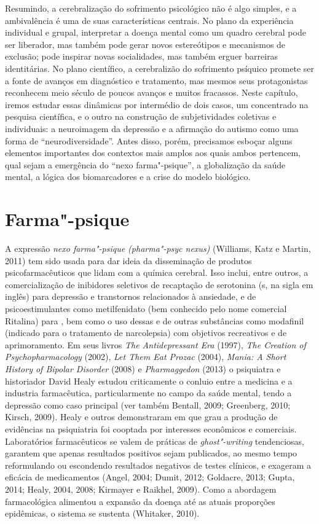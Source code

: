 Resumindo, a cerebralização do sofrimento psicológico não é algo
simples, e a ambivalência é uma de suas características centrais. No
plano da experiência individual e grupal, interpretar a doença mental
como um quadro cerebral pode ser liberador, mas também pode gerar novos
estereótipos e mecanismos de exclusão; pode inspirar novas socialidades,
mas também erguer barreiras identitárias. No plano científico, a
cerebralizão do sofrimento psíquico promete ser a fonte de avanços em
diagnóstico e tratamento, mas mesmos seus protagonistas reconhecem meio
século de poucos avanços e muitos fracassos. Neste capítulo, iremos
estudar essas dinâmicas por intermédio de dois casos, um concentrado na
pesquisa científica, e o outro na construção de subjetividades coletivas
e individuais: a neuroimagem da depressão e a afirmação do autismo como
uma forma de ``neurodiversidade''. Antes disso, porém, precisamos
esboçar alguns elementos importantes dos contextos mais amplos aos quais
ambos pertencem, qual sejam a emergência do ``nexo farma"-psique'', a
globalização da saúde mental, a lógica dos biomarcadores e a crise do
modelo biológico.

\chapter{Farma"-psique}

A expressão \emph{nexo farma"-psique (pharma"-psyc nexus)} (Williams, Katz
e Martin, 2011) tem sido usada para dar ideia da disseminação de
produtos psicofarmacêuticos que lidam com a química cerebral. Isso
inclui, entre outros, a comercialização de inibidores seletivos de
recaptação de serotonina (s, na sigla em inglês) para depressão e
transtornos relacionados à ansiedade, e de psicoestimulantes como
metilfenidato (bem conhecido pelo nome comercial Ritalina) para ,
bem como o uso dessas e de outras substâncias como modafinil (indicado
para o tratamento de narcolepsia) com objetivos recreativos e de
aprimoramento. Em seus livros \emph{The Antidepressant Era} (1997),
\emph{The Creation of Psychopharmacology} (2002), \emph{Let Them Eat
Prozac} (2004), \emph{Mania: A Short History of Bipolar Disorder} (2008)
e \emph{Pharmaggedon} (2013) o psiquiatra e historiador David Healy
estudou criticamente o conluio entre a medicina e a industria
farmacêutica, particularmente no campo da saúde mental, tendo a
depressão como caso principal (ver também Bentall, 2009; Greenberg,
2010; Kirsch, 2009). Healy e outros demonstraram em que grau a produção
de evidências na psiquiatria foi cooptada por interesses econômicos e
comerciais. Laboratórios farmacêuticos se valem de práticas de
\emph{ghost"-writing} tendenciosas, garantem que apenas resultados
positivos sejam publicados, ao mesmo tempo reformulando ou escondendo
resultados negativos de testes clínicos, e exageram a eficácia de
medicamentos (Angel, 2004; Dumit, 2012; Goldacre, 2013; Gupta, 2014;
Healy, 2004, 2008; Kirmayer e Raikhel, 2009). Como a abordagem
farmacológica alimentou a expansão da doença até as atuais proporções
epidêmicas, o sistema se sustenta (Whitaker, 2010).

